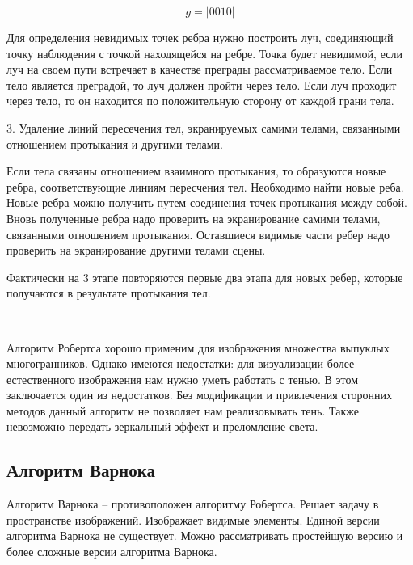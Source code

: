 \begin{equation}
	g = |0010|
	\label{eq:ref3}
\end{equation}

Для определения невидимых точек ребра нужно построить луч, соединяющий точку наблюдения с точкой находящейся на ребре.
Точка будет невидимой, если луч на своем пути встречает в качестве преграды рассматриваемое тело.
Если тело является преградой, то луч должен пройти через тело.
Если луч проходит через тело, то он находится по положительную сторону от каждой грани тела.

3. Удаление линий пересечения тел, экранируемых самими телами, связанными отношением протыкания и другими телами.

Если тела связаны отношением взаимного протыкания, то образуются новые ребра, соответствующие линиям пересчения тел. Необходимо найти новые реба. Новые ребра можно получить путем соединения точек протыкания между собой. Вновь полученные ребра надо проверить на экранирование самими телами, связанными отношением протыкания. Оставшиеся видимые части ребер надо проверить на экранирование другими телами сцены.

Фактически на 3 этапе повторяются первые два этапа для новых ребер, которые получаются в результате протыкания тел.

~

Алгоритм Робертса хорошо применим для изображения множества выпуклых многогранников. Однако имеются недостатки: для визуализации более естественного изображения нам нужно уметь работать с тенью. В этом заключается один из недостатков. Без модификации и привлечения сторонних методов данный алгоритм не позволяет нам реализовывать тень. Также невозможно передать зеркальный эффект и преломление света.

\subsection{Алгоритм Варнока}

Алгоритм Варнока -- противоположен алгоритму Робертса. Решает задачу в пространстве изображений. Изображает видимые элементы. Единой версии алгоритма Варнока не существует. Можно рассматривать простейшую версию и более сложные версии алгоритма Варнока.

\begin{figure}[ht!]
\end{figure}

